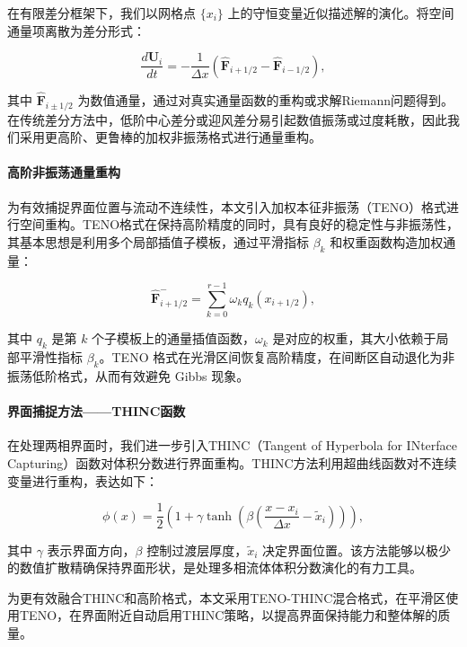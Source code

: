 \documentclass{article}
\numberwithin{equation}{section}    %
\begin{document}
在有限差分框架下，我们以网格点 $\{x_i\}$ 上的守恒变量近似描述解的演化。将空间通量项离散为差分形式：

\begin{equation}
\frac{d \mathbf{U}_i}{d t} = -\frac{1}{\Delta x} \left( \hat{\mathbf{F}}_{i+1/2} - \hat{\mathbf{F}}_{i-1/2} \right),
\end{equation}

其中 $\hat{\mathbf{F}}_{i\pm 1/2}$ 为数值通量，通过对真实通量函数的重构或求解Riemann问题得到。在传统差分方法中，低阶中心差分或迎风差分易引起数值振荡或过度耗散，因此我们采用更高阶、更鲁棒的加权非振荡格式进行通量重构。

\paragraph{高阶非振荡通量重构}

为有效捕捉界面位置与流动不连续性，本文引入加权本征非振荡（TENO）格式进行空间重构。TENO格式在保持高阶精度的同时，具有良好的稳定性与非振荡性，其基本思想是利用多个局部插值子模板，通过平滑指标 $\beta_k$ 和权重函数构造加权通量：

\begin{equation}
\hat{\mathbf{F}}_{i+1/2}^{-} = \sum_{k=0}^{r-1} \omega_k q_k(x_{i+1/2}),
\end{equation}

其中 $q_k$ 是第 $k$ 个子模板上的通量插值函数，$\omega_k$ 是对应的权重，其大小依赖于局部平滑性指标 $\beta_k$。TENO 格式在光滑区间恢复高阶精度，在间断区自动退化为非振荡低阶格式，从而有效避免 Gibbs 现象。

\paragraph{界面捕捉方法——THINC函数}

在处理两相界面时，我们进一步引入THINC（Tangent of Hyperbola for INterface Capturing）函数对体积分数进行界面重构。THINC方法利用超曲线函数对不连续变量进行重构，表达如下：

\begin{equation}
\phi(x) = \frac{1}{2} \left(1 + \gamma \tanh\left( \beta \left( \frac{x - x_{i}}{\Delta x} - \tilde{x}_i \right) \right) \right),
\end{equation}

其中 $\gamma$ 表示界面方向，$\beta$ 控制过渡层厚度，$\tilde{x}_i$ 决定界面位置。该方法能够以极少的数值扩散精确保持界面形状，是处理多相流体体积分数演化的有力工具。

为更有效融合THINC和高阶格式，本文采用TENO-THINC混合格式，在平滑区使用TENO，在界面附近自动启用THINC策略，以提高界面保持能力和整体解的质量。
\end{document}
